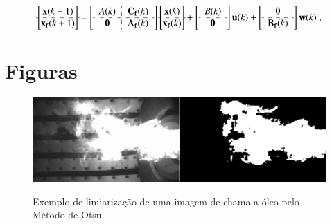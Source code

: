\begin{equation} \label{eq:modeloSSShapingFilter_Estadosaumentado_processo}
     \begin{bmatrix}
        \mathbf{x}(k+1)\\
        \hdashline
        \mathbf{x_f}(k+1)
    \end{bmatrix}
    =
     \left[\begin{tabular}{c:c}
        $A(k)$&$\mathbf{C_f}(k)$\\
        \hdashline
        $\mathbf{0}$&$\mathbf{A_f}(k)$
    \end{tabular} \right]
     \begin{bmatrix}
        \mathbf{x}(k)\\
        \hdashline
        \mathbf{x_f}(k)
    \end{bmatrix}
    +
    \left[\begin{tabular}{c}
        $B(k)$\\
        \hdashline
        $\mathbf{0}$
    \end{tabular} \right] \mathbf{u}(k)
    +
    \left[\begin{tabular}{c}
        $\mathbf{0}$\\
        \hdashline
        $\mathbf{B_f}(k)$
    \end{tabular} \right] \mathbf{w}(k) \ ,
\end{equation}

\section{Figuras}

\begin{figure}[H]%
        \centering
      \caption{Exemplo de limiarização de uma imagem de chama a óleo pelo Método de Otsu.}
         \includegraphics[scale=0.4]{Imagens/OTSU-VVap30kg-0004-impar.jpg}
       \label{imagem:limiarizaçãoOTSU}
\end{figure}




